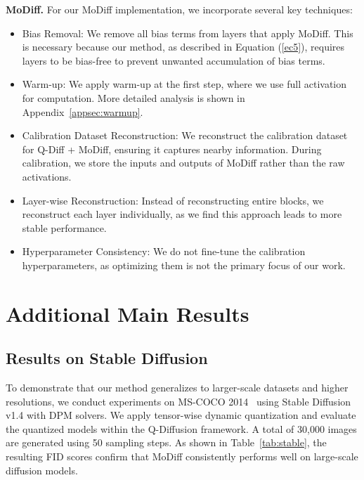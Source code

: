 \textbf{MoDiff.}
For our MoDiff implementation, we incorporate several key techniques: 
\begin{itemize}
\item Bias Removal: We remove all bias terms from layers that apply MoDiff. This is necessary because our method, as described in Equation (\ref{ec5}), requires layers to be bias-free to prevent unwanted accumulation of bias terms.

\item Warm-up: We apply warm-up at the first step, where we use full activation for computation. More detailed analysis is shown in Appendix~\ref{appsec:warmup}.

\item Calibration Dataset Reconstruction: We reconstruct the calibration dataset for Q-Diff + MoDiff, ensuring it captures nearby information. During calibration, we store the inputs and outputs of MoDiff rather than the raw activations.

\item Layer-wise Reconstruction: Instead of reconstructing entire blocks, we reconstruct each layer individually, as we find this approach leads to more stable performance.

\item Hyperparameter Consistency: We do not fine-tune the calibration hyperparameters, as optimizing them is not the primary focus of our work.

\end{itemize}

\section{Additional Main Results}

\subsection{Results on Stable Diffusion}
\label{appse: stable}

To demonstrate that our method generalizes to larger-scale datasets and higher resolutions, we conduct experiments on MS-COCO 2014~\citep{lin2014microsoft} using Stable Diffusion v1.4 with DPM solvers\citep{lu2022dpm}. We apply tensor-wise dynamic quantization and evaluate the quantized models within the Q-Diffusion framework. A total of 30,000 images are generated using 50 sampling steps. As shown in Table~\ref{tab:stable}, the resulting FID scores confirm that MoDiff consistently performs well on large-scale diffusion models.

